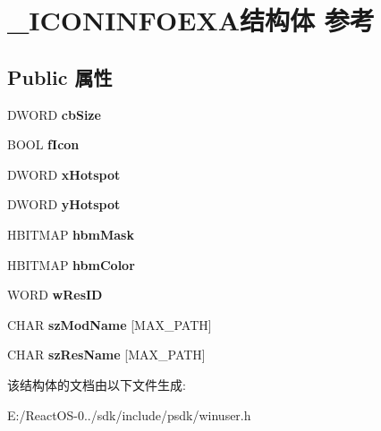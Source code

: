 \hypertarget{struct___i_c_o_n_i_n_f_o_e_x_a}{}\section{\+\_\+\+I\+C\+O\+N\+I\+N\+F\+O\+E\+X\+A结构体 参考}
\label{struct___i_c_o_n_i_n_f_o_e_x_a}
\subsection*{Public 属性}
\begin{DoxyCompactItemize}
\item 
\mbox{\label{struct___i_c_o_n_i_n_f_o_e_x_a_a218ef868653eebd90547c49b8314fdfa}} 
D\+W\+O\+RD {\bfseries cb\+Size}
\item 
\mbox{\label{struct___i_c_o_n_i_n_f_o_e_x_a_aebe0c0573098a53919aef6afb211e295}} 
B\+O\+OL {\bfseries f\+Icon}
\item 
\mbox{\label{struct___i_c_o_n_i_n_f_o_e_x_a_af6c8c1e55d5d9a54b8e718b2563b869a}} 
D\+W\+O\+RD {\bfseries x\+Hotspot}
\item 
\mbox{\label{struct___i_c_o_n_i_n_f_o_e_x_a_a947ed5c999f83eabbb98c295a885f4a9}} 
D\+W\+O\+RD {\bfseries y\+Hotspot}
\item 
\mbox{\label{struct___i_c_o_n_i_n_f_o_e_x_a_a0971df3b9ce5ec712f4ce5575094c65a}} 
H\+B\+I\+T\+M\+AP {\bfseries hbm\+Mask}
\item 
\mbox{\label{struct___i_c_o_n_i_n_f_o_e_x_a_a77be143dbf235dbe0e5755f40ceeb409}} 
H\+B\+I\+T\+M\+AP {\bfseries hbm\+Color}
\item 
\mbox{\label{struct___i_c_o_n_i_n_f_o_e_x_a_a4b3fa091d064db94f128ae2dacaaf240}} 
W\+O\+RD {\bfseries w\+Res\+ID}
\item 
\mbox{\label{struct___i_c_o_n_i_n_f_o_e_x_a_adf96384e2c53e0fc0e344d5423edc41b}} 
C\+H\+AR {\bfseries sz\+Mod\+Name} \mbox{[}M\+A\+X\+\_\+\+P\+A\+TH\mbox{]}
\item 
\mbox{\label{struct___i_c_o_n_i_n_f_o_e_x_a_a07c292f0ab41afcca50887439b207bfc}} 
C\+H\+AR {\bfseries sz\+Res\+Name} \mbox{[}M\+A\+X\+\_\+\+P\+A\+TH\mbox{]}
\end{DoxyCompactItemize}


该结构体的文档由以下文件生成\+:\begin{DoxyCompactItemize}
\item 
E\+:/\+React\+O\+S-\/0../sdk/include/psdk/winuser.\+h\end{DoxyCompactItemize}
